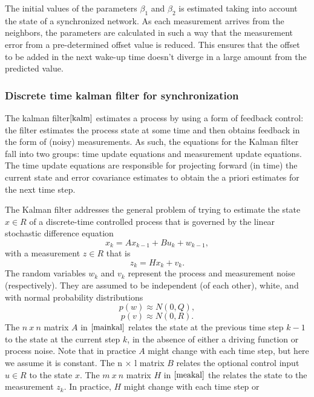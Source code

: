 \documentclass[journal]{IEEEtran}
\begin{document}
\par
The initial values of the parameters $\beta_1$ and $\beta_2$ is
estimated taking into account the state of a synchronized network.
As each measurement arrives from the neighbors, the parameters are
calculated in such a way that the measurement error from a
pre-determined offset value is reduced. This ensures that the offset
to be added in the next wake-up time doesn't diverge in a large
amount from the predicted value.
\subsubsection{\textbf{Discrete time kalman filter for synchronization}}
The kalman filter$\cite{kalm}$ estimates a process by using a form of feedback
control: the filter estimates the process state at some time and
then obtains feedback in the form of (noisy) measurements. As such,
the equations for the Kalman filter fall into two groups: time
update equations and measurement update equations. The time update
equations are responsible for projecting forward (in time) the
current state and error covariance estimates to obtain the a priori
estimates for the next time step.
\par
The Kalman filter addresses the general problem of trying to
estimate the state $x \in R$ of a discrete-time controlled process that is
governed by the linear stochastic difference equation
\begin{equation}
 x_k = Ax_{k-1} + Bu_k + w_{k-1} , \label{mainkal}
\end{equation}
with a measurement $z \in R$ that is
\begin{equation}
 z_k = Hx_k + v_k. \label{meakal}
\end{equation}
The random variables $w_k$ and $v_k$ represent the process and
measurement noise (respectively). They are assumed to be
independent (of each other), white, and with normal probability
distributions
\begin{equation}
 p(w) \approx N(0,Q),
\end{equation}
\begin{equation}
 p(v) \approx N(0,R).
\end{equation}
The $n\ x\ n$ matrix $A$ in $\ref{mainkal}$ relates the state at the previous time step $k-1$ to the state at the current step $k$, in the absence of either a driving function or process noise. Note that in practice $A$ might change with each time step, but                                                                   
here we assume it is constant. The n × l matrix $B$ relates the optional control input $u \in R$ to the state $x$. The $m\ x\ n$ matrix $H$ in $\ref{meakal}$ the relates the state to the measurement $z_k$. In practice, $H$ might change with each time step or
\end{document}
